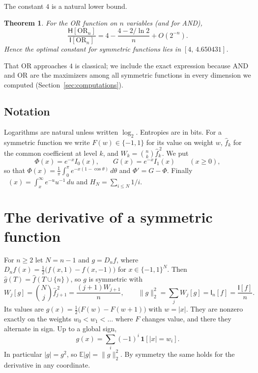 \documentclass[11pt]{amsart}
\newtheorem{mainthm}{Theorem}
\theoremstyle{definition}
\theoremstyle{remark}
\newcommand{\bits}{\{-1,1\}}
\newcommand{\E}{\mathbb E}
\newcommand{\HH}{\mathsf H}
\newcommand{\I}{\mathsf I}
\newcommand{\wh}[1]{\widehat{#1}}
\DeclareMathOperator{\Ei}{E_1}
\begin{document}
The constant $4$ is a natural lower bound.

\begin{mainthm}\label{thm:lower}
For the OR function on $n$ variables (and for AND),
\[
 \frac{\HH[\mathrm{OR}_n]}{\I[\mathrm{OR}_n]}=4-\frac{4-2/\ln2}{n}+O(2^{-n}).
\]
Hence the optimal constant for symmetric functions lies in $[4,\,4.650431]$.
\end{mainthm}

That OR approaches $4$ is classical; we include the exact expression because AND and OR are the maximizers among all symmetric functions in every dimension we computed (Section~\ref{sec:computations}).

\subsection*{Notation}
Logarithms are natural unless written $\log_2$. Entropies are in bits. For a symmetric function we write $F(w)\in\bits$ for its value on weight $w$, $\wh f_k$ for the common coefficient at level $k$, and $W_k=\binom nk\wh f_k^{\,2}$. We put
\[
 \Phi(x)=e^{-x}I_0(x),\qquad G(x)=e^{-x}I_1(x)\qquad(x\ge0),
\]
so that $\Phi(x)=\frac1\pi\int_0^\pi e^{-x(1-\cos\theta)}\,d\theta$ and $\Phi'=G-\Phi$. Finally $\Ei(x)=\int_x^\infty e^{-u}u^{-1}\,du$ and $H_N=\sum_{i\le N}1/i$.

\section{The derivative of a symmetric function}\label{sec:split}

For $n\ge2$ let $N=n-1$ and $g=D_nf$, where $D_nf(x)=\tfrac12\bigl(f(x,1)-f(x,-1)\bigr)$ for $x\in\bits^N$. Then $\wh g(T)=\wh f(T\cup\{n\})$, so $g$ is symmetric with
\begin{equation}\label{eq:derivative}
 W_j[g]=\binom Nj\wh f_{j+1}^{\,2}=\frac{(j+1)W_{j+1}}{n},\qquad \|g\|_2^2=\sum_jW_j[g]=\I_n[f]=\frac{\I[f]}n.
\end{equation}
Its values are $g(x)=\tfrac12\bigl(F(w)-F(w+1)\bigr)$ with $w=|x|$. They are nonzero exactly on the weights $w_0<w_1<\dots$ where $F$ changes value, and there they alternate in sign. Up to a global sign,
\begin{equation}\label{eq:alternating}
 g(x)=\sum_{i}(-1)^i\,\mathbf 1[|x|=w_i].
\end{equation}
In particular $|g|=g^2$, so $\E|g|=\|g\|_2^2$. By symmetry the same holds for the derivative in any coordinate.
\end{document}
